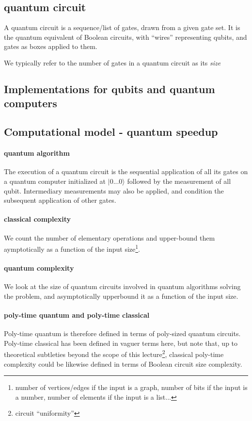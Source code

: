 \documentclass{article}
\begin{document}
\subsection{quantum circuit}

A quantum circuit is a sequence/list of gates, drawn from a given gate set. It is the quantum
equivalent of Boolean circuits, with ``wires'' representing qubits, and gates as boxes
applied to them.

We typically refer to the number of gates in a quantum circuit as its \emph{size}

\subsection{Implementations for qubits and quantum computers}

\subsection{Computational model - quantum speedup}

\paragraph{quantum algorithm} The execution of a quantum circuit is the
sequential application of all its gates on a quantum computer
initialized at $|0...0\rangle$ followed by the measurement of all qubit.
Intermediary measurements may also be applied, and condition the subsequent application
of other gates. 

\paragraph{classical complexity}
We count the number of elementary operations and upper-bound them aymptotically 
as a function of the input size\footnote{number of vertices/edges if the input is a graph, 
number of bits if the input is a number, number of elements if the input is a list...}.

\paragraph{quantum complexity} We look at the size of quantum circuits involved in
quantum algorithms solving the problem, and asymptotically upperbound it as a function
of the input size.

\paragraph{poly-time quantum and poly-time classical} Poly-time quantum is therefore
defined in terms of poly-sized quantum circuits. Poly-time classical
has been defined in vaguer terms here, but note that, up to theoretical
subtleties beyond the scope of this lecture\footnote{circuit ``uniformity''
}, classical poly-time complexity could be likewise defined in terms
of Boolean circuit size complexity.
\end{document}
